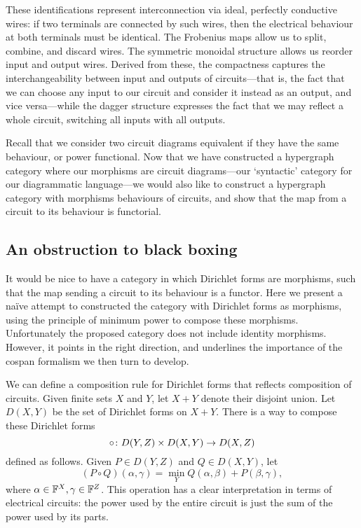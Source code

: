 These identifications represent interconnection via ideal, perfectly conductive
wires: if two terminals are connected by such wires, then the electrical
behaviour at both terminals must be identical. The Frobenius maps allow us to
split, combine, and discard wires.  The symmetric monoidal structure allows
us reorder input and output wires. Derived from these, the compactness captures the
interchangeability between input and outputs of circuits---that is, the fact
that we can choose any input to our circuit and consider it instead as an
output, and vice versa---while the dagger structure expresses the fact that we
may reflect a whole circuit, switching all inputs with all outputs.

Recall that we consider two circuit diagrams equivalent if they have the same
behaviour, or power functional. Now that we have constructed a hypergraph
category where our morphisms are circuit diagrams---our `syntactic' category for
our diagrammatic language---we would also like to construct a hypergraph
category with morphisms behaviours of circuits, and show that the map from a
circuit to its behaviour is functorial.


\subsection{An obstruction to black boxing} \label{ssec.noidentities}

It would be nice to have a category in which Dirichlet forms are morphisms, such
that the map sending a circuit to its behaviour is a functor.  Here we present a
na\"ive attempt to constructed the category with Dirichlet forms as morphisms,
using the principle of minimum power to compose these morphisms.  Unfortunately
the proposed category does not include identity morphisms.  However, it points
in the right direction, and underlines the importance of the cospan formalism we
then turn to develop.

We can define a composition rule for Dirichlet forms that reflects composition
of circuits.  Given finite sets $X$ and $Y$, let $X+Y$ denote their disjoint
union.  Let $D(X,Y)$ be the set of Dirichlet forms on $X+Y$. There is a way to
compose these Dirichlet forms
\[ 
\circ {\colon} D(Y,Z) \times D(X,Y) \to D(X,Z) 
\]
defined as follows.  Given $P \in D(Y,Z)$ and $Q \in D(X,Y)$, let
\[ 
  (P \circ Q)(\alpha, \gamma) = \min_{Y} Q(\alpha, \beta) + P(\beta, \gamma),
\]
where $\alpha \in {\mathbb F}^X, \gamma \in {\mathbb F}^Z$. This operation has a clear
interpretation in terms of electrical circuits: the power used by the entire
circuit is just the sum of the power used by its parts. 

